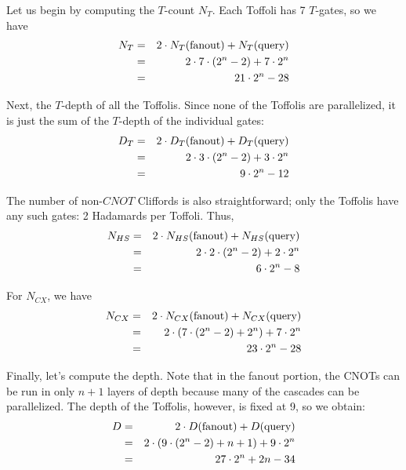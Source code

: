 \documentclass[a4paper,12pt]{article}
\begin{document}
Let us begin by computing the $T$-count $N_T$. 
Each Toffoli has 7 $T$-gates, so we have
\begin{eqnarray}
 \nonumber N_T &=& 2 \cdot N_T(\hbox{fanout}) + N_T(\hbox{query}) \\
 \nonumber    &=& 2 \cdot 7 \cdot (2^n - 2) + 7 \cdot 2^n \\
     &=& 21 \cdot 2^n - 28
\end{eqnarray}

Next, the $T$-depth of all the Toffolis. 
Since none of the Toffolis are parallelized, it is just the sum of the $T$-depth of the individual gates:
\begin{eqnarray}
 \nonumber D_T &=& 2 \cdot D_T(\hbox{fanout}) + D_T(\hbox{query}) \\
 \nonumber    &=& 2 \cdot 3 \cdot (2^n - 2) + 3 \cdot 2^n \\
     &=& 9 \cdot 2^n - 12
\end{eqnarray}

The number of non-$CNOT$ Cliffords is also straightforward; only the Toffolis have any such gates: 2 Hadamards per Toffoli. 
Thus,
\begin{eqnarray}
 \nonumber N_{HS} &=& 2 \cdot N_{HS}(\hbox{fanout}) + N_{HS}(\hbox{query}) \\
 \nonumber    &=& 2 \cdot 2 \cdot (2^n - 2) + 2 \cdot 2^n \\
     &=& 6 \cdot 2^n - 8
\end{eqnarray}

For $N_{CX}$, we have
\begin{eqnarray}
 \nonumber N_{CX} &=& 2 \cdot N_{CX}(\hbox{fanout}) + N_{CX}(\hbox{query}) \\
 \nonumber    &=& 2 \cdot \left(7 \cdot (2^n - 2) + 2^n \right)  + 7 \cdot 2^n \\
     &=& 23 \cdot 2^n - 28
\end{eqnarray}

Finally, let's compute the depth. 
Note that in the fanout portion, the CNOTs can be run in only $n + 1$ layers of depth because many of the cascades can be parallelized. 
The depth of the Toffolis, however, is fixed at 9, so we obtain:
\begin{eqnarray}
 \nonumber D &=& 2 \cdot D (\hbox{fanout}) + D (\hbox{query}) \\
 \nonumber    &=& 2 \cdot \left(9 \cdot (2^n - 2) +n + 1 \right) + 9 \cdot 2^n \\
     &=& 27 \cdot 2^n + 2n -34
\end{eqnarray}
\end{document}
